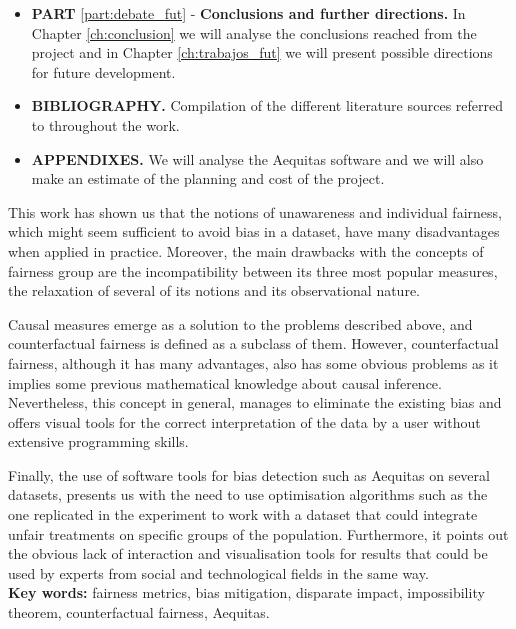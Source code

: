 \begin{itemize}
    \item \textbf{PART} \ref{part:debate_fut} - \textbf{Conclusions and further directions.} In Chapter \ref{ch:conclusion} we will analyse the conclusions reached from the project and in Chapter \ref{ch:trabajos_fut} we will present possible directions for future development. \vspace{3mm}
    \item \textbf{BIBLIOGRAPHY.} Compilation of the different literature sources referred to throughout the work. \vspace{3mm}
    \item \textbf{APPENDIXES.} We will analyse the Aequitas software and we will also make an estimate of the planning and cost of the project. \vspace{3mm}
\end{itemize}

This work has shown us that the notions of unawareness and individual fairness, which might seem sufficient to avoid bias in a dataset, have many disadvantages when applied in practice. Moreover, the main drawbacks with the concepts of fairness group are the incompatibility between its three most popular measures, the relaxation of several of its notions and its observational nature.

Causal measures emerge as a solution to the problems described above, and counterfactual fairness is defined as a subclass of them. However, counterfactual fairness, although it has many advantages, also has some obvious problems as it implies some previous mathematical knowledge about causal inference. Nevertheless, this concept in general, manages to eliminate the existing bias and offers visual tools for the correct interpretation of the data by a user without extensive programming skills.

Finally, the use of software tools for bias detection such as Aequitas on several datasets, presents us with the need to use optimisation algorithms such as the one replicated in the experiment to work with a dataset that could integrate unfair treatments on specific groups of the population. Furthermore, it points out the obvious lack of interaction and visualisation tools for results that could be used by experts from social and technological fields in the same way.\\

\textbf{Key words:} fairness metrics, bias mitigation, disparate impact,  impossibility theorem, counterfactual fairness, Aequitas.